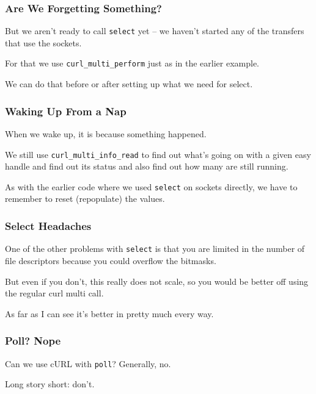 \begin{frame}
	\frametitle{Are We Forgetting Something?}

	But we aren't ready to call \texttt{select} yet -- we haven't started any of the transfers  that use the sockets.

	For that we use \texttt{curl\_multi\_perform} just as in the earlier example.

	We can do that before or after setting up what we need for select.

\end{frame}


\begin{frame}
	\frametitle{Waking Up From a Nap}

	When we wake up, it is because something happened.

	We still use \texttt{curl\_multi\_info\_read} to find out what's going on with a given easy handle and find out its status and also find out how many are still running.

	As with the earlier code where we used \texttt{select} on sockets directly, we have to remember to reset (repopulate) the values.

\end{frame}


\begin{frame}
	\frametitle{Select Headaches}

	One of the other problems with \texttt{select} is that you are limited in the number of file descriptors because you could overflow the bitmasks.

	But even if you don't, this really does not scale, so you would be better off using the regular curl multi call.

	As far as I can see it's better in pretty much every way.

\end{frame}

\begin{frame}
	\frametitle{Poll? Nope}

	Can we use cURL with \texttt{poll}? Generally, no.

	Long story short: don't.

\end{frame}






